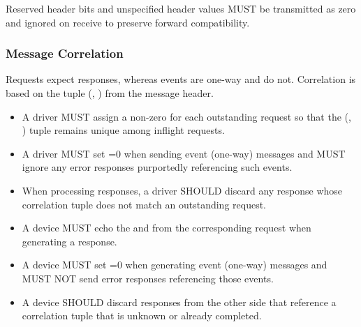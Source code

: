 Reserved header bits and unspecified header values MUST be transmitted as zero and ignored on
receive to preserve forward compatibility.

\subsubsection{Message Correlation}
\label{sec:Virtio Transport Options / Virtio Over Messages / Basic Concepts / Correlation}

Requests expect responses, whereas events are one-way and do not. Correlation is
based on the tuple (, ) from the message header.

\begin{itemize}
  \item A driver MUST assign a non-zero  for each outstanding request so that the
        (, ) tuple remains unique among inflight requests.
  \item A driver MUST set =0 when sending event (one-way) messages and MUST ignore any
        error responses purportedly referencing such events.
  \item When processing responses, a driver SHOULD discard any response whose correlation tuple does
        not match an outstanding request.
\end{itemize}

\begin{itemize}
  \item A device MUST echo the  and  from the corresponding request when
        generating a response.
  \item A device MUST set =0 when generating event (one-way) messages and MUST NOT send
        error responses referencing those events.
  \item A device SHOULD discard responses from the other side that reference a correlation tuple that
        is unknown or already completed.
\end{itemize}


